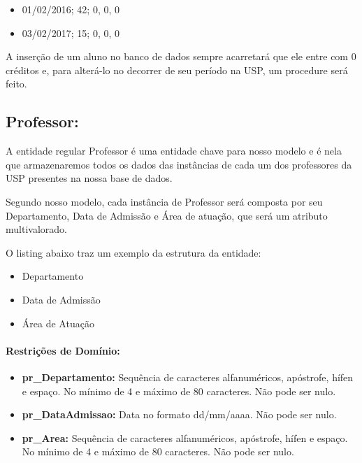 \documentclass{report}
\begin{document}
\begin{itemize}
	\item 01/02/2016; 42; 0, 0, 0
	\item 03/02/2017; 15; 0, 0, 0
\end{itemize}

A inserção de um aluno no banco de dados sempre acarretará que ele entre com 0 créditos e, para alterá-lo no decorrer de seu período na USP, um procedure será feito.
\subsection{Professor:}
	A entidade regular Professor é uma entidade chave para nosso modelo e é nela que armazenaremos todos os dados das instâncias de cada um dos professores da USP presentes na nossa base de dados.
	
	Segundo nosso modelo, cada instância de Professor será composta por seu Departamento, Data de Admissão e Área de atuação, que será um atributo multivalorado.
	
	O listing abaixo traz um exemplo da estrutura da entidade:
\begin{itemize}
  \item Departamento
  \item Data de Admissão
  \item Área de Atuação
\end{itemize}
\paragraph{Restrições de Domínio:}
\begin{itemize}
  \item \textbf{pr\_Departamento:} Sequência de caracteres alfanuméricos, apóstrofe, hífen e espaço. No mínimo de 4 e máximo de 80 caracteres. Não pode ser nulo.
  \item \textbf{pr\_DataAdmissao:} Data no formato dd/mm/aaaa. Não pode ser nulo.
  \item \textbf{pr\_Area:} Sequência de caracteres alfanuméricos, apóstrofe, hífen e espaço. No mínimo de 4 e máximo de 80 caracteres. Não pode ser nulo.
\end{itemize}
\end{document}
